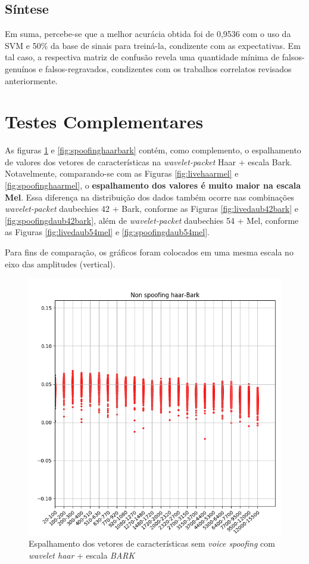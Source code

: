 		\subsection{Síntese}
   			\par Em suma, percebe-se que a melhor acurácia obtida foi de 0,9536 com o uso da SVM e 50\% da base de sinais para treiná-la, condizente com as expectativas. Em tal caso, a respectiva matriz de confusão revela uma quantidade mínima de falsos-genuínos e falsos-regravados, condizentes com os trabalhos correlatos revisados anteriormente.
	
	\section{Testes Complementares}
	\label{chap:testsResults:sec:Experimento05}
		As figuras \ref{fig:livehaarbark} e \ref{fig:spoofinghaarbark} contém, como complemento, o espalhamento de valores dos vetores de características na \textit{wavelet-packet} Haar + escala Bark. Notavelmente, comparando-se com as Figuras \ref{fig:livehaarmel} e \ref{fig:spoofinghaarmel}, o \textbf{espalhamento dos valores é muito maior na escala \textbf{Mel}}. Essa diferença na distribuição dos dados também ocorre nas combinações \textit{wavelet-packet} daubechies 42 + Bark, conforme as Figuras \ref{fig:livedaub42bark} e \ref{fig:spoofingdaub42bark}, além de \textit{wavelet-packet} daubechies 54 + Mel, conforme as Figuras \ref{fig:livedaub54mel} e \ref{fig:spoofingdaub54mel}.
		
		\par Para fins de comparação, os gráficos foram colocados em uma mesma escala no eixo das amplitudes (vertical).
		\begin{figure}
			\centering
			\includegraphics[width=\linewidth]{images/results/barkVersusMel/liveHaarBark}
			\caption{Espalhamento dos vetores de características sem \textit{voice spoofing} com \textit{wavelet haar} + escala \textit{BARK} }
			\label{fig:livehaarbark}
		\end{figure}
	
